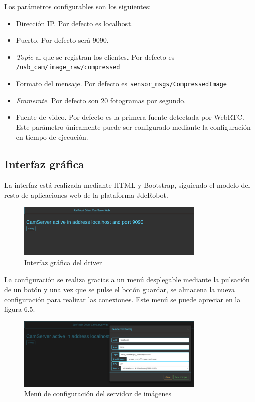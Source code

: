 Los parámetros configurables son los siguientes:
\begin{itemize}
\item Dirección IP. Por defecto es localhost.
\item Puerto. Por defecto será 9090.
\item \textit{Topic} al que se registran los clientes. Por defecto es \texttt{/usb\_cam/image\_raw/compressed}
\item Formato del mensaje. Por defecto es \texttt{sensor\_msgs/CompressedImage}
\item \textit{Framerate}. Por defecto son 20 fotogramas por segundo.
\item Fuente de video. Por defecto es la primera fuente detectada por WebRTC. Este parámetro únicamente puede ser configurado mediante la configuración en tiempo de ejecución.
\end{itemize}

\subsection{Interfaz gráfica}
La interfaz está realizada mediante HTML y Bootstrap, siguiendo el modelo del resto de aplicaciones web de la plataforma JdeRobot.
\begin{figure}[H]
  \begin{center}
    \includegraphics[width=0.8\textwidth]{figures/Interfazcamserver.png}
		\caption{Interfaz gráfica del driver}
		\label{fig.interfazcamserver}
		\end{center}
\end{figure}
La configuración se realiza gracias a un menú desplegable mediante la pulsación de un botón y una vez que se pulse el botón guardar, se almacena la nueva configuración para realizar las conexiones. Este menú se puede apreciar en la figura 6.5.
 \begin{figure}[H]
  \begin{center}
    \includegraphics[width=0.8\textwidth]{figures/configcamserver.png}
		\caption{Menú de configuración del servidor de imágenes}
		\label{fig.configcamserver}
		\end{center}
\end{figure}


